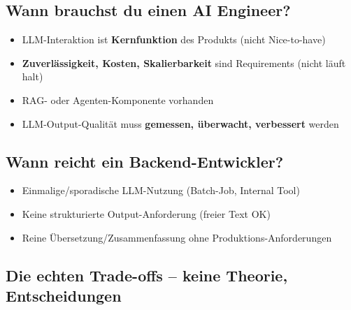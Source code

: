 
\subsection*{Wann brauchst du einen AI Engineer?}
\begin{itemize}[leftmargin=*]
    \item LLM-Interaktion ist \textbf{Kernfunktion} des Produkts (nicht Nice-to-have)
    \item \textbf{Zuverlässigkeit, Kosten, Skalierbarkeit} sind Requirements (nicht \glqq läuft halt\grqq)
    \item RAG- oder Agenten-Komponente vorhanden
    \item LLM-Output-Qualität muss \textbf{gemessen, überwacht, verbessert} werden
\end{itemize}

\subsection*{Wann reicht ein Backend-Entwickler?}
\begin{itemize}[leftmargin=*]
    \item Einmalige/sporadische LLM-Nutzung (Batch-Job, Internal Tool)
    \item Keine strukturierte Output-Anforderung (freier Text OK)
    \item Reine Übersetzung/Zusammenfassung ohne Produktions-Anforderungen
\end{itemize}

\subsection*{Die echten Trade-offs -- keine Theorie, Entscheidungen}

